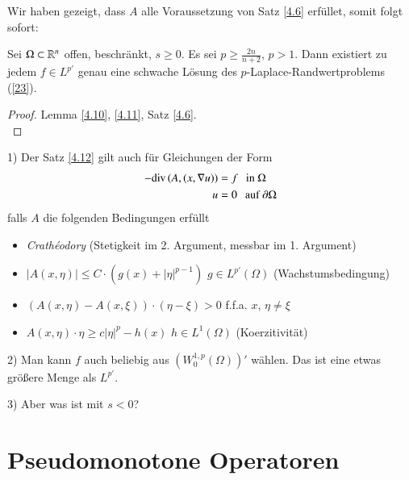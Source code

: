 Wir haben gezeigt, dass $A$ alle Voraussetzung von Satz \ref{4.6} erfüllet, somit folgt sofort:

\begin{theorem}\label{4.12}
    Sei $\Omega\subset\mathbb{R}^n$ offen, beschränkt, $s\geq 0$. Es sei $p\geq  \frac{2n}{n+2}$, $p>1$. Dann
    existiert zu jedem $f\in L^{p'}$ genau eine schwache Lösung des $p$-Laplace-Randwertproblems
    (\ref{23}).
\end{theorem}

\begin{proof}
    Lemma \ref{4.10}, \ref{4.11}, Satz \ref{4.6}.
    \[ \]
\end{proof}

\begin{remark}
    \begin{description}
        \item{1)}
        Der Satz \ref{4.12} gilt auch für Gleichungen der Form
        \begin{align*}
            -\mathrm{div}\,(A,(x,\nabla u))&=f \hspace{.25cm} \text{in } \Omega\\
                        u&=0 \hspace{.25cm} \text{auf }\partial\Omega
        \end{align*}
        falls $A$ die folgenden Bedingungen erfüllt
        \begin{itemize}
            \item \textit{Crathéodory} (Stetigkeit im 2. Argument, messbar im 1. Argument)
            \item  $|A(x,\eta)|\leq C\cdot (g(x)+ |\eta|^{p-1})$ $g\in L^{p'}(\Omega)$
                (Wachstumsbedingung)
            \item $(A(x,\eta)- A(x,\xi))\cdot (\eta-\xi)>0$ f.f.a. $x$, $\eta\neq \xi$
            \item $A(x,\eta)\cdot\eta\geq c|\eta|^p-h(x)$ $h\in L^1(\Omega)$ (Koerzitivität)
        \end{itemize}
        \item{2)}
        Man kann $f$ auch beliebig aus $(W_0^{1,p}(\Omega))'$ wählen. Das ist eine etwas größere Menge
        als $L^{p'}$.
        \item{3)} Aber was ist mit $s<0$?
    \end{description}
\end{remark}

\section{Pseudomonotone Operatoren}

